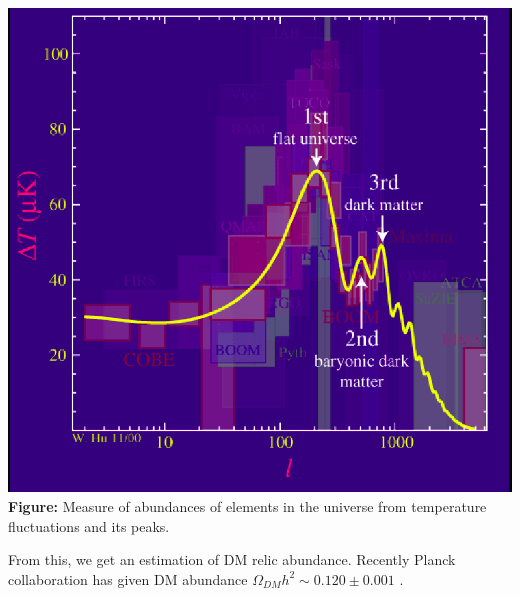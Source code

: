 \documentclass[12pt]{report}
\begin{document}
  \begin{center}
  \includegraphics[scale=0.3]{PEAKS.png}\\
  \textbf{Figure:} Measure of abundances of elements in the universe from temperature fluctuations and its peaks.   \cite{whu}
  \end{center}
  
 From this, we get an estimation of DM relic abundance. Recently Planck collaboration has given DM abundance $\Omega_{DM}h^2 \sim 0.120 \pm 0.001 $ \cite{pcolab}.\\
\end{document}
